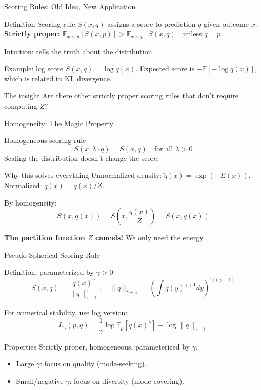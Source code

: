 \documentclass{beamer}
\begin{document}
\begin{frame}{Scoring Rules: Old Idea, New Application}
\small
\begin{block}{Definition}
Scoring rule $S(x, q)$ assigns a score to prediction $q$ given outcome $x$.
\textbf{Strictly proper:} $\mathbb{E}_{x \sim p}[S(x, p)] > \mathbb{E}_{x \sim p}[S(x, q)]$ unless $q = p$.

Intuition: tells the truth about the distribution.
\end{block}

\begin{block}{Example: log score}
$S(x, q) = \log q(x)$. Expected score is $-\mathbb{E}[- \log q(x)]$, which is related to KL divergence.
\end{block}

\begin{block}{The insight}
Are there other strictly proper scoring rules that don't require computing $Z$?
\end{block}
\end{frame}


\begin{frame}{Homogeneity: The Magic Property}
\small
\begin{block}{Homogeneous scoring rule}
$$S(x, \lambda \cdot q) = S(x, q) \quad \text{for all } \lambda > 0$$
Scaling the distribution doesn't change the score.
\end{block}

\begin{block}{Why this solves everything}
Unnormalized density: $\tilde{q}(x) = \exp(-E(x))$. Normalized: $q(x) = \tilde{q}(x) / Z$.

By homogeneity:
$$S(x, q(x)) = S\left(x, \frac{\tilde{q}(x)}{Z}\right) = S(x, \tilde{q}(x))$$

\textbf{The partition function $Z$ cancels!} We only need the energy.
\end{block}
\end{frame}


\begin{frame}{Pseudo-Spherical Scoring Rule}
\small
\begin{block}{Definition, parameterized by $\gamma > 0$}
$$S(x, q) = \frac{q(x)^\gamma}{\|q\|_{\gamma+1}^\gamma}, \quad \|q\|_{\gamma+1} = \left(\int q(y)^{\gamma+1} dy\right)^{1/(\gamma+1)}$$

For numerical stability, use log version:
$$L_\gamma(p, q) = \frac{1}{\gamma}\log\mathbb{E}_p[q(x)^\gamma] - \log\|q\|_{\gamma+1}$$
\end{block}

\begin{block}{Properties}
Strictly proper, homogeneous, parameterized by $\gamma$.
\begin{itemize}
    \item Large $\gamma$: focus on quality (mode-seeking).
    \item Small/negative $\gamma$: focus on diversity (mode-covering).
\end{itemize}
\end{block}
\end{frame}
\end{document}
